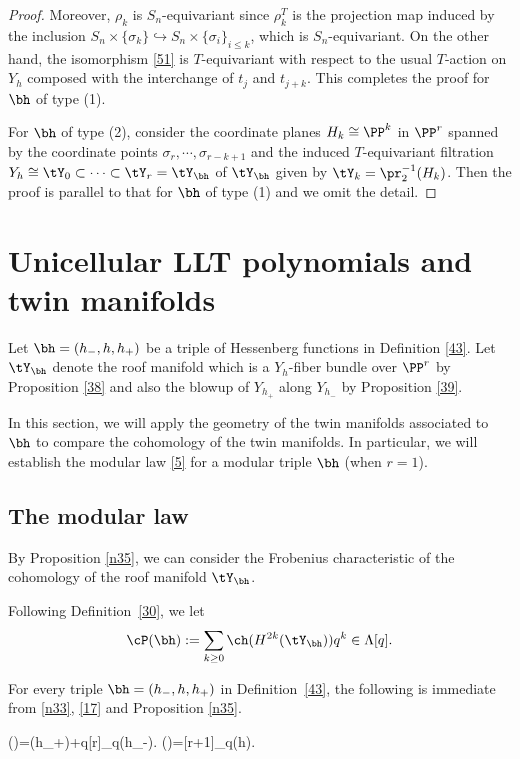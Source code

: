 \begin{proof}
	Moreover, $\rho_k$ is $S_n$-equivariant since $\rho_k^T$ is the projection map induced by the inclusion $S_n\times \{\sigma_k\} \hookrightarrow  S_n\times \{\sigma_i\}_{i\leq k}$, which is $S_n$-equivariant.	
	On the other hand, the isomorphism \eqref{51} is $T$-equivariant with respect to the usual $T$-action on $Y_h$ composed with the interchange of $t_j$ and $t_{j+k}$. 
	This completes the proof for $\bh$ of type (1).
	
	For $\bh$ of type (2), consider the coordinate planes $H_k\cong \PP^{k}$ in $\PP^r$ spanned by the coordinate points $\sigma_r,\cdots, \sigma_{r-k+1}$ and the induced $T$-equivariant filtration $Y_h\cong \tY_0 \subset \cdots \subset \tY_r=\tY_\bh$ 
	of $\tY_\bh$ given by $\tY_k=\pr_2^{-1}(H_k)$. Then the proof is parallel to that for $\bh$ of type (1) and we omit the detail.	
\end{proof}

\section{Unicellular LLT polynomials and twin manifolds}\label{S4}
		
Let $\bh=(h_-,h,h_+)$ be a triple of Hessenberg functions in Definition \ref{43}.
Let $\tY_\bh$ denote the roof manifold which is a $Y_h$-fiber bundle over $\PP^r$ by Proposition \ref{38} and also the blowup of $Y_{h_+}$ along $Y_{h_-}$ by Proposition \ref{39}. 
 
In this section, we will apply the geometry of the twin manifolds associated to $\bh$ to compare the cohomology of the twin manifolds. 
In particular, we will establish the modular law \eqref{5}
for a modular triple $\bh$ (when $r=1$). 

\subsection{The modular law}

By Proposition \ref{n35}, we can consider the Frobenius characteristic of the cohomology of the roof manifold $\tY_\bh$. 
\begin{definition}\label{28}
	Following Definition~\ref{30}, we let
	\[\cP(\bh):=\sum_{k\geq 0}\ch(H^{2k}(\tY_\bh))q^k \in \Lambda[q].\]
\end{definition}

For every triple $\bh=(h_-,h,h_+)$ in Definition~\ref{43}, the following is immediate from \eqref{n33}, \eqref{17} and Proposition \ref{n35}.
\begin{proposition}\label{27}
	\beq \label{31} \cP(\bh)=\cP(h_+)+q[r]_q\cP(h_-).\eeq
	\beq \label{32}\cP(\bh)=[r+1]_q\cP(h).\eeq
\end{proposition}



